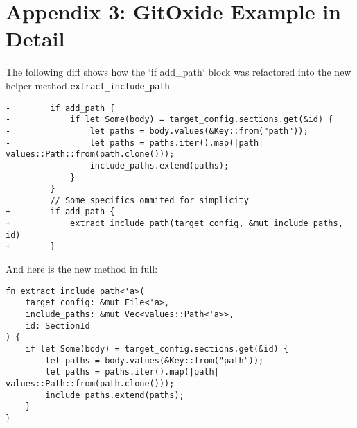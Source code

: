 \section{Appendix 3: GitOxide Example in Detail}
\label{sec:appendix_3}


The following diff shows how the `if add\_path` block was refactored into the
new helper method \texttt{extract\_include\_path}.

\begin{verbatim}
-        if add_path {
-            if let Some(body) = target_config.sections.get(&id) {
-                let paths = body.values(&Key::from("path"));
-                let paths = paths.iter().map(|path| values::Path::from(path.clone()));
-                include_paths.extend(paths);
-            }
-        }
         // Some specifics ommited for simplicity
+        if add_path {
+            extract_include_path(target_config, &mut include_paths, id)
+        }
\end{verbatim}

And here is the new method in full:

\begin{verbatim}
fn extract_include_path<'a>(
    target_config: &mut File<'a>,
    include_paths: &mut Vec<values::Path<'a>>,
    id: SectionId
) {
    if let Some(body) = target_config.sections.get(&id) {
        let paths = body.values(&Key::from("path"));
        let paths = paths.iter().map(|path| values::Path::from(path.clone()));
        include_paths.extend(paths);
    }
}
\end{verbatim}